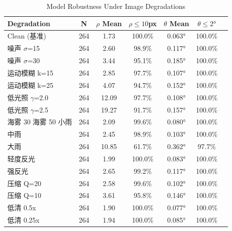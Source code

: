 \begin{table}[htbp]
\centering
\caption{Model Robustness Under Image Degradations}
\label{tab:degradation_robustness}
\begin{tabular}{lcccccc}
\toprule
Degradation & N & $\rho$ Mean & $\rho \leq 10$px & $\theta$ Mean & $\theta \leq 2°$ \\
\midrule
Clean (基准) & 264 & 1.73 & 100.0\% & 0.063° & 100.0\% \\
噪声 $\sigma$=15 & 264 & 2.60 & 98.9\% & 0.117° & 100.0\% \\
噪声 $\sigma$=30 & 264 & 3.44 & 95.1\% & 0.185° & 100.0\% \\
运动模糊 k=15 & 264 & 2.85 & 97.7\% & 0.107° & 100.0\% \\
运动模糊 k=25 & 264 & 4.07 & 94.7\% & 0.152° & 100.0\% \\
低光照 $\gamma$=2.0 & 264 & 12.09 & 97.7\% & 0.108° & 100.0\% \\
低光照 $\gamma$=2.5 & 264 & 19.27 & 91.7\% & 0.157° & 100.0\% \\
海雾 30%
海雾 50%
小雨 & 264 & 2.09 & 99.6\% & 0.080° & 100.0\% \\
中雨 & 264 & 2.45 & 98.9\% & 0.103° & 100.0\% \\
大雨 & 264 & 10.85 & 61.7\% & 0.362° & 97.7\% \\
轻度反光 & 264 & 1.99 & 100.0\% & 0.083° & 100.0\% \\
强反光 & 264 & 2.65 & 99.2\% & 0.117° & 100.0\% \\
压缩 Q=20 & 264 & 2.58 & 99.6\% & 0.102° & 100.0\% \\
压缩 Q=10 & 264 & 3.61 & 95.8\% & 0.146° & 100.0\% \\
低清 0.5x & 264 & 1.90 & 100.0\% & 0.077° & 100.0\% \\
低清 0.25x & 264 & 1.94 & 100.0\% & 0.085° & 100.0\% \\
\bottomrule
\end{tabular}
\end{table}